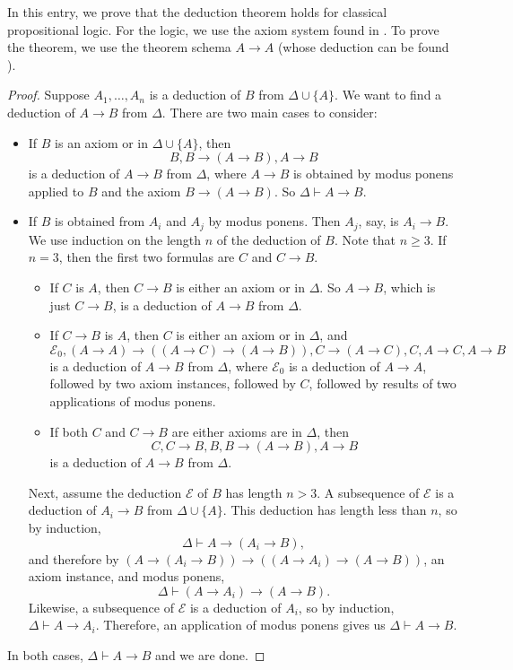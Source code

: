 \documentclass[12pt]{article}
\begin{document}
In this entry, we prove that the deduction theorem holds for classical propositional logic.  For the logic, we use the axiom system found in .  To prove the theorem, we use the theorem schema $A\to A$ (whose deduction can be found ).

\begin{proof}  Suppose $A_1, \ldots, A_n$ is a deduction of $B$ from $\Delta \cup \lbrace A \rbrace$.  We want to find a deduction of $A\to B$ from $\Delta$.  There are two main cases to consider:
\begin{itemize}
\item
If $B$ is an axiom or in $\Delta\cup \lbrace A\rbrace$, then $$B, B\to (A\to B), A\to B$$ is a deduction of $A\to B$ from $\Delta$, where $A\to B$ is obtained by modus ponens applied to $B$ and the axiom $B\to (A\to B)$.  So $\Delta \vdash A\to B$.
\item
If $B$ is obtained from $A_i$ and $A_j$ by modus ponens.  Then $A_j$, say, is $A_i \to B$.  We use induction on the length $n$ of the deduction of $B$.  Note that $n\ge 3$.  If $n=3$, then the first two formulas are $C$ and $C\to B$.
\begin{itemize}
\item 
If $C$ is $A$, then $C\to B$ is either an axiom or in $\Delta$.  So $A\to B$, which is just $C\to B$, is a deduction of $A\to B$ from $\Delta$.
\item 
If $C\to B$ is $A$, then $C$ is either an axiom or in $\Delta$, and
$$\mathcal{E}_0,(A\to A)\to ((A\to C) \to (A\to B)),C\to(A\to C),C,A\to C, A\to B$$
is a deduction of $A\to B$ from $\Delta$, where $\mathcal{E}_0$ is a deduction of $A\to A$, followed by two axiom instances, followed by $C$, followed by results of two applications of modus ponens.
\item 
If both $C$ and $C\to B$ are either axioms are in $\Delta$, then
$$C, C\to B, B, B\to (A\to B), A\to B$$
is a deduction of $A\to B$ from $\Delta$.
\end{itemize}
Next, assume the deduction $\mathcal{E}$ of $B$ has length $n>3$.
A subsequence of $\mathcal{E}$ is a deduction of $A_i \to B$ from $\Delta \cup \lbrace A\rbrace$.  This deduction has length less than $n$, so by induction, $$\Delta \vdash A \to (A_i\to B),$$ and therefore by $(A \to (A_i\to B)) \to ((A\to A_i)\to (A\to B))$, an axiom instance, and modus ponens, $$\Delta \vdash (A\to A_i)\to (A\to B).$$
Likewise, a subsequence of $\mathcal{E}$ is a deduction of $A_i$, so by induction, $\Delta \vdash A \to A_i$.  Therefore, an application of modus ponens gives us $\Delta \vdash A\to B$.
\end{itemize}
In both cases, $\Delta \vdash A\to B$ and we are done.
\end{proof}
\end{document}
